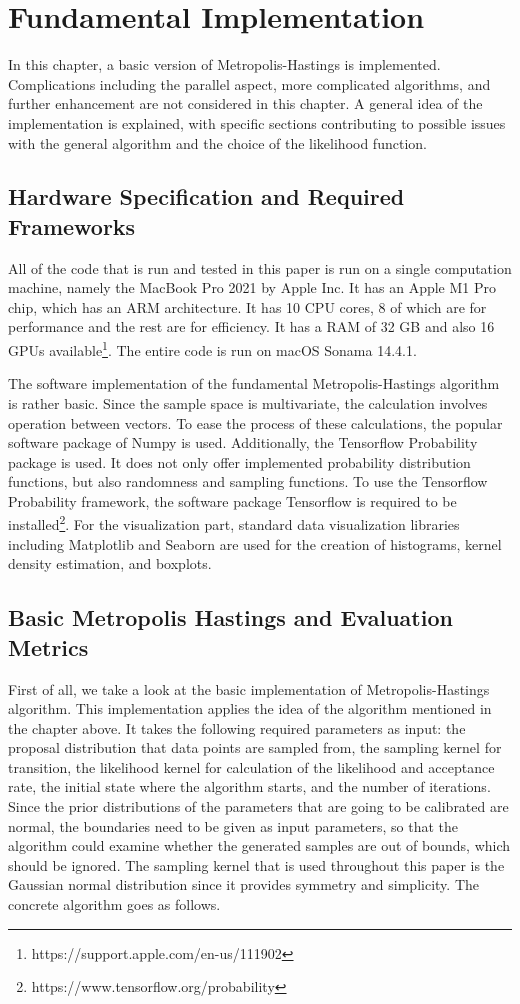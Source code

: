 \chapter{Fundamental Implementation}
In this chapter, a basic version of Metropolis-Hastings is implemented. Complications including the parallel aspect, more complicated algorithms, and further enhancement are not considered in this chapter. A general idea of the implementation is explained, with specific sections contributing to possible issues with the general algorithm and the choice of the likelihood function.

\section{Hardware Specification and Required Frameworks}
All of the code that is run and tested in this paper is run on a single computation machine, namely the MacBook Pro 2021 by Apple Inc. It has an Apple M1 Pro chip, which has an ARM architecture. It has 10 CPU cores, 8 of which are for performance and the rest are for efficiency. It has a RAM of 32 GB and also 16 GPUs available\footnote{https://support.apple.com/en-us/111902}. The entire code is run on macOS Sonama 14.4.1.

The software implementation of the fundamental Metropolis-Hastings algorithm is rather basic. Since the sample space is multivariate, the calculation involves operation between vectors. To ease the process of these calculations, the popular software package of Numpy is used.\cite{numpy} Additionally, the Tensorflow Probability package is used. It does not only offer implemented probability distribution functions, but also randomness and sampling functions.\cite{tfp} To use the Tensorflow Probability framework, the software package Tensorflow is required to be installed\footnote{https://www.tensorflow.org/probability}. For the visualization part, standard data visualization libraries including Matplotlib and Seaborn are used for the creation of histograms, kernel density estimation, and boxplots.\cite{plt}

\section{Basic Metropolis Hastings and Evaluation Metrics}
First of all, we take a look at the basic implementation of Metropolis-Hastings algorithm. This implementation applies the idea of the algorithm mentioned in the chapter above. It takes the following required parameters as input: the proposal distribution that data points are sampled from, the sampling kernel for transition, the likelihood kernel for calculation of the likelihood and acceptance rate, the initial state where the algorithm starts, and the number of iterations. Since the prior distributions of the parameters that are going to be calibrated are normal, the boundaries need to be given as input parameters, so that the algorithm could examine whether the generated samples are out of bounds, which should be ignored. The sampling kernel that is used throughout this paper is the Gaussian normal distribution since it provides symmetry and simplicity.\cite{gaussian_distribution_property} The concrete algorithm goes as follows.

